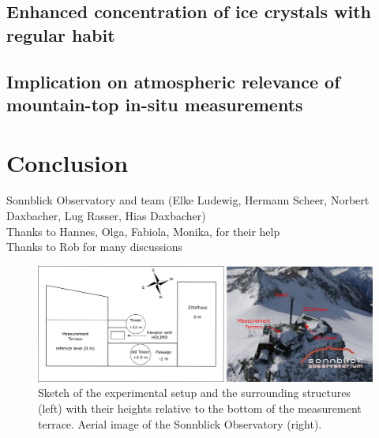 \documentclass[draft,linenumbers]{agujournal}
\begin{document}
\subsection{Enhanced concentration of ice crystals with regular habit}



\subsection{Implication on atmospheric relevance of mountain-top in-situ measurements}



\section{Conclusion}
\label{Summary}



\begin{acronyms}
\end{acronyms}


\acknowledgments
Sonnblick Observatory and team (Elke Ludewig, Hermann Scheer, Norbert Daxbacher, Lug Rasser, Hias Daxbacher)\\
Thanks to Hannes, Olga, Fabiola, Monika, for their help\\
Thanks to Rob for many discussions



\newpage

\begin{figure}[t]
 \centering
 	\includegraphics[width=14cm]{SONSetUp.png}
 \caption{Sketch of the experimental setup and the surrounding structures (left) with their heights relative to the bottom of the measurement terrace. Aerial image of the Sonnblick Observatory (right).}
 \label{fig:SetUp}
\end{figure}
\end{document}
